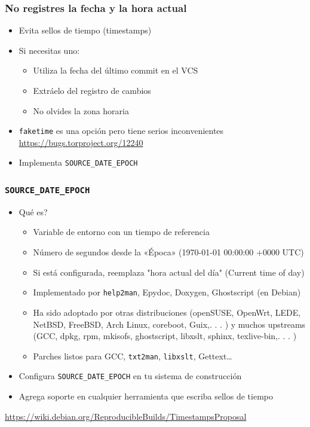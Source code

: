 \documentclass[14pt,aspectratio=169]{beamer}
\begin{document}
\begin{frame}
 \frametitle{No registres la fecha y la hora actual}

 \begin{itemize}
  \item Evita sellos de tiempo (timestamps)
  \item<2-> Si necesitas uno:
    \begin{itemize}
      \item Utiliza la fecha del último commit en el VCS
      \item Extráelo del registro de cambios
      \item<3-> \alert{No olvides la zona horaria}
    \end{itemize}
  \item<4-> \texttt{faketime} es una opción pero tiene serios inconvenientes \\
    {\small \url{https://bugs.torproject.org/12240}}
  \item<5> Implementa \texttt{SOURCE\_DATE\_EPOCH}
 \end{itemize}
\end{frame}

\begin{frame}
 \frametitle{\texttt{SOURCE\_DATE\_EPOCH}}

 \begin{itemize}
   \item Qué es?
     \begin{itemize}
       \item Variable de entorno con un tiempo de referencia
       \item Número de segundos desde la «Época» (1970-01-01 00:00:00 +0000 UTC)
       \item Si está configurada, reemplaza "hora actual del día" (Current time of day)
       \item Implementado por \texttt{help2man}, Epydoc, Doxygen, Ghostscript (en Debian)
       \item Ha sido adoptado por otras distribuciones (openSUSE, OpenWrt,
LEDE, NetBSD, FreeBSD, Arch Linux, coreboot, Guix,. . . ) y
muchos upstreams (GCC, dpkg, rpm, mkisofs, ghostscript, libxslt,
sphinx, texlive-bin,. . . )
       \item Parches listos para GCC, \texttt{txt2man}, \texttt{libxslt}, Gettext…
     \end{itemize}
   \item<2-> Configura \texttt{SOURCE\_DATE\_EPOCH} en tu sistema de construcción
   \item<3> Agrega soporte en cualquier herramienta que escriba sellos de tiempo
 \end{itemize}

 \begin{center}
   {\small \url{https://wiki.debian.org/ReproducibleBuilds/TimestampsProposal}}
 \end{center}
\end{frame}
\end{document}
